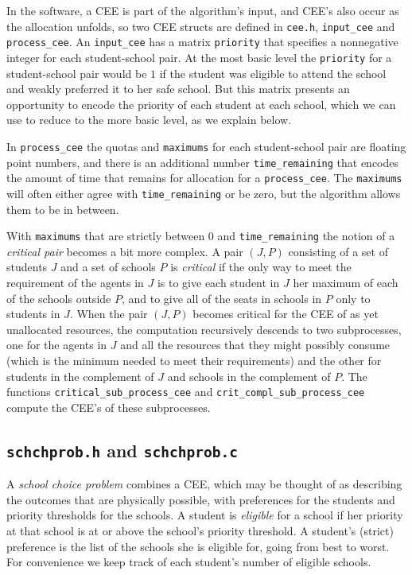 \documentclass[12pt]{article}
\theoremstyle{definition}
\begin{document}
\begin{appendix}
In the software, a CEE is part of the algorithm's input, and CEE's
also occur as the allocation unfolds, so two CEE structs are defined
in \texttt{cee.h}, \texttt{input\_cee} and \texttt{process\_cee}.  An
\texttt{input\_cee} has a matrix \texttt{priority} that specifies a
nonnegative integer for each student-school pair.  At the most basic
level the \texttt{priority} for a student-school pair would be $1$ if
the student was eligible to attend the school and weakly preferred it
to her safe school.  But this matrix presents an opportunity to encode
the priority of each student at each school, which we can use to
reduce to the more basic level, as we explain below.

In \texttt{process\_cee} the quotas and \texttt{maximums} for each
student-school pair are floating point numbers, and there is an
additional number \texttt{time\_remaining} that encodes the amount of
time that remains for allocation for a \texttt{process\_cee}.  The
\texttt{maximums} will often either agree with \texttt{time\_remaining} or be
zero, but the algorithm allows them to be in between.

With \texttt{maximums} that are strictly between $0$ and
\texttt{time\_remaining} the notion of a \emph{critical pair} becomes
a bit more complex.  A pair $(J,P)$ consisting of a set of students
$J$ and a set of schools $P$ is \emph{critical} if the only way to
meet the requirement of the agents in $J$ is to give each student in
$J$ her maximum of each of the schools outside $P$, and to give all of
the seats in schools in $P$ only to students in $J$.  When the pair
$(J,P)$ becomes critical for the CEE of as yet unallocated resources,
the computation recursively descends to two subprocesses, one for the
agents in $J$ and all the resources that they might possibly consume
(which is the minimum needed to meet their requirements) and the other
for students in the complement of $J$ and schools in the complement of
$P$.  The functions \texttt{critical\_sub\_process\_cee} and
\texttt{crit\_compl\_sub\_process\_cee} compute the CEE's of these
subprocesses.

\subsection{\texttt{schchprob.h} and \texttt{schchprob.c}}

A \emph{school choice problem} combines a CEE, which may be thought of
as describing the outcomes that are physically possible, with
preferences for the students and priority thresholds for the schools.
A student is \emph{eligible} for a school if her priority at that
school is at or above the school's priority threshold. A student's
(strict) preference is the list of the schools she is eligible for,
going from best to worst.  For convenience we keep track of each
student's number of eligible schools.


\end{appendix}
\end{document}
